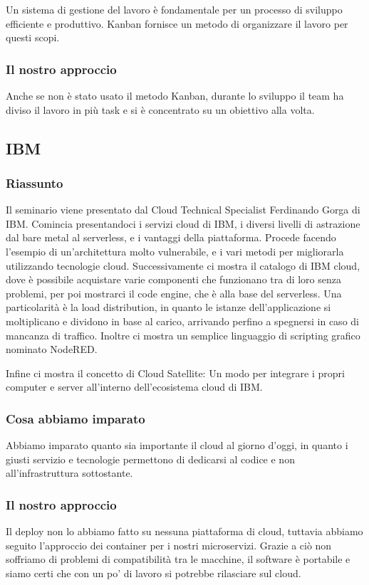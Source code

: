 \documentclass{report}
\begin{document}
Un sistema di gestione del lavoro è fondamentale per un processo di sviluppo efficiente e produttivo. Kanban fornisce un metodo di organizzare il lavoro per questi scopi.

\subsubsection*{Il nostro approccio}

Anche se non è stato usato il metodo Kanban, durante lo sviluppo il team ha diviso il lavoro in più task e si è concentrato su un obiettivo alla volta.

\subsection{IBM}
\subsubsection*{Riassunto}
Il seminario viene  presentato dal Cloud Technical Specialist Ferdinando Gorga di IBM.
Comincia presentandoci i servizi cloud di IBM, i diversi livelli di astrazione dal bare metal al serverless, e i vantaggi della piattaforma.
Procede facendo l'esempio di un'architettura molto vulnerabile, e i vari metodi per migliorarla utilizzando tecnologie cloud.
Successivamente ci mostra il catalogo di IBM cloud, dove è possibile acquistare varie componenti che funzionano tra di loro senza problemi, per poi mostrarci il code engine, che è alla base del serverless. Una particolarità è la load distribution, in quanto le istanze dell'applicazione si moltiplicano e dividono in base al carico,
arrivando perfino a spegnersi in caso di mancanza di traffico. 
Inoltre ci mostra un semplice linguaggio di scripting grafico nominato NodeRED.

Infine ci mostra il concetto di Cloud Satellite: Un modo per integrare i propri computer e server all'interno dell'ecosistema cloud di IBM.
\subsubsection*{Cosa abbiamo imparato}
Abbiamo imparato quanto sia importante il cloud al giorno d'oggi, in quanto i giusti servizio e tecnologie permettono di dedicarsi al codice e non all'infrastruttura sottostante.
\subsubsection*{Il nostro approccio}
Il deploy non lo abbiamo fatto su nessuna piattaforma di cloud, tuttavia abbiamo seguito l'approccio dei container per i nostri microservizi. 
Grazie a ciò non soffriamo di problemi di compatibilità tra le macchine, il software è portabile e siamo certi che con un po' di lavoro si potrebbe rilasciare sul cloud.
\end{document}
